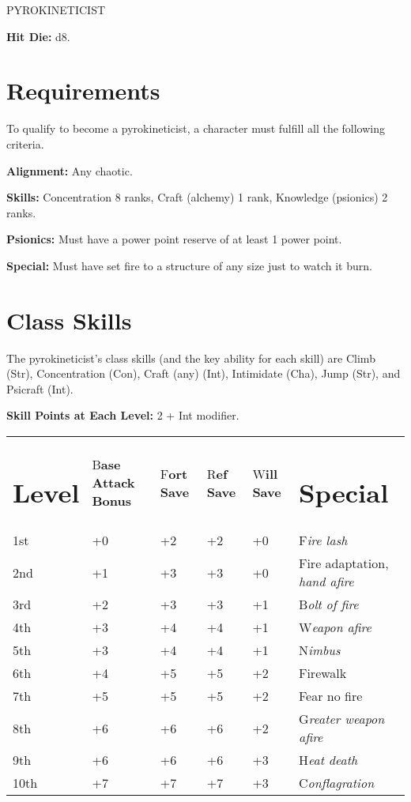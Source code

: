 \documentclass{article}
\begin{document}
\vspace{12pt}
{\LARGE{}PYROKINETICIST}

\textbf{Hit Die:} d8.

\vspace{12pt}
\section*{\textbf{Requirements}}

To qualify to become a pyrokineticist, a character must fulfill all the following 
criteria.

\textbf{Alignment:} Any chaotic.

\textbf{Skills:} Concentration 8 ranks, Craft (alchemy) 1 rank, Knowledge (psionics) 
2 ranks.

\textbf{Psionics:} Must have a power point reserve of at least 1 power point.

\textbf{Special:} Must have set fire to a structure of any size just to watch it 
burn.

\vspace{12pt}
\section*{\textbf{Class Skills}}

The pyrokineticist's class skills (and the key ability for each skill) are Climb 
(Str), Concentration (Con), Craft (any) (Int), Intimidate (Cha), Jump (Str), and 
Psicraft (Int). 

\textbf{Skill Points at Each Level:} 2 + Int modifier.

\vspace{12pt}
\begin{tabular}{|>{\raggedright}p{21pt}|>{\raggedright}p{52pt}|>{\raggedright}p{34pt}|>{\raggedright}p{34pt}|>{\raggedright}p{26pt}|>{\raggedright}p{109pt}|}
\hline
\multicolumn{6}{|p{278pt}|}{T\textbf{able: The Pyrokineticist}}\tabularnewline
\hline
\section*{L\textbf{evel}} & B\textbf{ase Attack Bonus} & F\textbf{ort Save} & R\textbf{ef 
Save} & W\textbf{ill Save} & \section*{S\textbf{pecial}}\tabularnewline
\hline
1st & +0 & +2 & +2 & +0 & F\textit{ire lash}\tabularnewline
\hline
2nd & +1 & +3 & +3 & +0 & Fire adaptation, \textit{hand afire}\tabularnewline
\hline
3rd & +2 & +3 & +3 & +1 & B\textit{olt of fire}\tabularnewline
\hline
4th & +3 & +4 & +4 & +1 & W\textit{eapon afire}\tabularnewline
\hline
5th & +3 & +4 & +4 & +1 & N\textit{imbus}\tabularnewline
\hline
6th & +4 & +5 & +5 & +2 & Firewalk\tabularnewline
\hline
7th & +5 & +5 & +5 & +2 & Fear no fire\tabularnewline
\hline
8th & +6 & +6 & +6 & +2 & G\textit{reater weapon afire}\tabularnewline
\hline
9th & +6 & +6 & +6 & +3 & H\textit{eat death}\tabularnewline
\hline
10th & +7 & +7 & +7 & +3 & C\textit{onflagration}\tabularnewline
\hline
\end{tabular}
\end{document}
